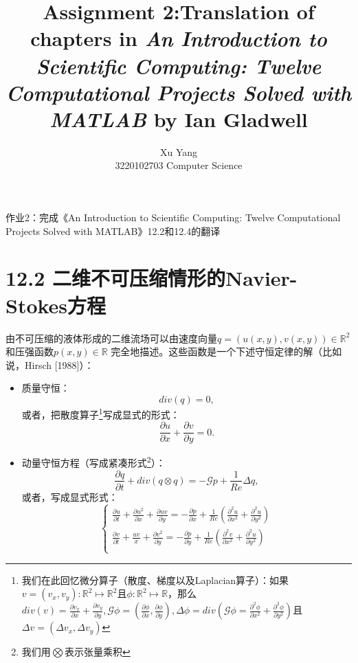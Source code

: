 \documentclass[nofonts]{ctexart} %
\title{Assignment 2:Translation of chapters in \textit{An Introduction to Scientific Computing: Twelve Computational Projects Solved with MATLAB} by Ian Gladwell}
\author{Xu Yang \\ 3220102703 Computer Science}
\begin{document}


\maketitle


作业2：完成《An Introduction to Scientific Computing: Twelve Computational Projects Solved with MATLAB》12.2和12.4的翻译\cite{intro}
\section{12.2 二维不可压缩情形的Navier-Stokes方程}
由不可压缩的液体形成的二维流场可以由速度向量$q = (u(x,y),v(x,y))\in \mathbb{R}^2 $ 
和压强函数$p(x,y)\in \mathbb{R}$ 完全地描述。这些函数是一个下述守恒定律的解（比如说，Hirsch [1988]）：
\begin{itemize}
\item   质量守恒：
        \begin{equation} \label{eq:div}
            div(q)=0,
        \end{equation}
或者，把散度算子\footnote{我们在此回忆微分算子（散度、梯度以及Laplacian算子）：如果$v=(v_x,v_y):\mathbb{R}^2 \longmapsto \mathbb{R}^2$且$\phi:\mathbb{R}^2 \longmapsto \mathbb{R}$，那么$div(v)=\frac{\partial v_x}{\partial x}+\frac{\partial v_y}{\partial y},\mathcal{G}\phi=(\frac{\partial\phi}{\partial x},\frac{\partial\phi}{\partial y}), \Delta \phi=div(\mathcal{G\phi}=\frac{\partial^2\phi}{\partial x^2}+\frac{\partial^2\phi}{\partial y^2})$且$\Delta v=(\Delta v_x,\Delta v_y)$}写成显式的形式：
        \begin{equation} \label{eq:div2}
            \frac{\partial u}{\partial x}+\frac{\partial v}{\partial y}=0.
        \end{equation}
\item   动量守恒方程（写成紧凑形式\footnote{我们用$\bigotimes$表示张量乘积}）：
        \begin{equation} \label{eq:momentum}
            \frac{\partial q}{\partial t}+div(q\otimes q)=-\mathcal{G}p +\frac{1}{Re} \Delta q,
        \end{equation}
或者，写成显式形式：
        \begin{equation} \label{eq:momentum2}
            \begin{cases}
            
            \frac{\partial u}{\partial t}+\frac{\partial u^2}{\partial x}+\frac{\partial uv}{\partial y}=-\frac{\partial p}{\partial x}+\frac{1}{Re}(\frac{\partial^2 u}{\partial x^2}+\frac{\partial^2 u}{\partial y^2})\\
            \frac{\partial v}{\partial t}+\frac{uv}{x}+\frac{\partial v^2}{\partial y}=-\frac{\partial p}{\partial y}+\frac{1}{Re}(\frac{\partial^2 v}{\partial x^2}+\frac{\partial^2 u}{\partial y^2})\\
            \end{cases}
        \end{equation}
        

\end{itemize}
\end{document}
